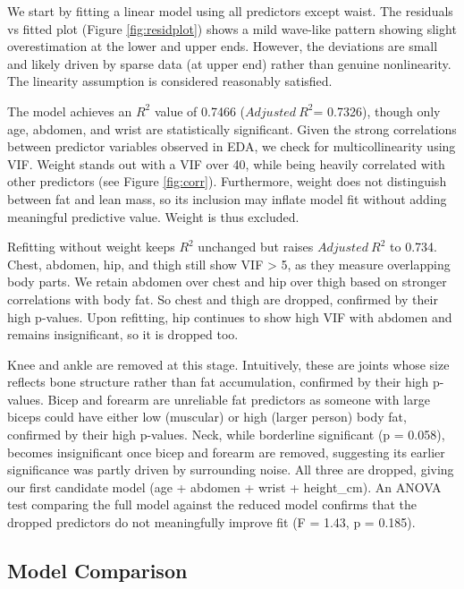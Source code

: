 \documentclass[letterpaper,9pt,twocolumn,twoside,]{pinp}
\begin{document}
We start by fitting a linear model using all predictors except waist.
The residuals vs fitted plot (Figure \ref{fig:residplot}) shows a mild
wave-like pattern showing slight overestimation at the lower and upper
ends. However, the deviations are small and likely driven by sparse data
(at upper end) rather than genuine nonlinearity. The linearity
assumption is considered reasonably satisfied.

The model achieves an \(R^2\) value of 0.7466 (\(Adjusted\ R^2\)=
0.7326), though only age, abdomen, and wrist are statistically
significant. Given the strong correlations between predictor variables
observed in EDA, we check for multicollinearity using VIF. Weight stands
out with a VIF over 40, while being heavily correlated with other
predictors (see Figure \ref{fig:corr}). Furthermore, weight does not
distinguish between fat and lean mass, so its inclusion may inflate
model fit without adding meaningful predictive value. Weight is thus
excluded.

Refitting without weight keeps \(R^2\) unchanged but raises
\(Adjusted\ R^2\) to 0.734. Chest, abdomen, hip, and thigh still show
VIF \textgreater{} 5, as they measure overlapping body parts. We retain
abdomen over chest and hip over thigh based on stronger correlations
with body fat. So chest and thigh are dropped, confirmed by their high
p-values. Upon refitting, hip continues to show high VIF with abdomen
and remains insignificant, so it is dropped too.

Knee and ankle are removed at this stage. Intuitively, these are joints
whose size reflects bone structure rather than fat accumulation,
confirmed by their high p-values. Bicep and forearm are unreliable fat
predictors as someone with large biceps could have either low (muscular)
or high (larger person) body fat, confirmed by their high p-values.
Neck, while borderline significant (p = 0.058), becomes insignificant
once bicep and forearm are removed, suggesting its earlier significance
was partly driven by surrounding noise. All three are dropped, giving
our first candidate model (age + abdomen + wrist + height\_cm). An ANOVA
test comparing the full model against the reduced model confirms that
the dropped predictors do not meaningfully improve fit (F = 1.43, p =
0.185).

\subsection{Model Comparison}\label{model-comparison}
\end{document}
